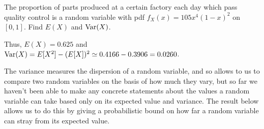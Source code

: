 \begin{examp}The proportion of parts produced at a certain factory each day which pass quality control is a random variable with pdf $f_X(x) = 105x^4(1-x)^2$ on $[0,1]$. Find $E(X)$ and $\operatorname{Var}(X)$.
\par
\noindent Thus, $E(X) = 0.625$ and $\operatorname{Var}(X) = E[X^2] - (E[X])^2 \simeq 0.4166 - 0.3906 = 0.0260$. 
\end{examp}
\par
The variance measures the dispersion of a random variable, and so allows to us to compare two random variables on the basis of how much they vary, but so far we haven't been able to make any concrete statements about the values a random variable can take based only on its expected value and variance. The result below allows us to do this by giving a probabilistic bound on how far a random variable can stray from its expected value.

